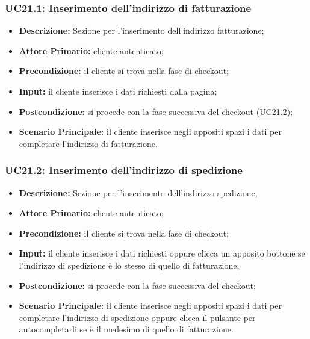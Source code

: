 \subsubsection{UC21.1: Inserimento dell'indirizzo di fatturazione}
\label{sec:UC21.1}
\begin{itemize}
    \item \textbf{Descrizione:} Sezione per l'inserimento dell'indirizzo fatturazione;
    \item \textbf{Attore Primario:} cliente autenticato;
    \item \textbf{Precondizione:} il cliente si trova nella fase di checkout;
    \item \textbf{Input:} il cliente inserisce i dati richiesti dalla pagina;
    \item \textbf{Postcondizione:} si procede con la fase successiva del checkout (\hyperref[sec:UC21.2]{\underline{UC21.2}});
    \item \textbf{Scenario Principale:} il cliente inserisce negli appositi spazi i dati per completare l'indirizzo di fatturazione.
\end{itemize}
\subsubsection{UC21.2: Inserimento dell'indirizzo di spedizione}
\label{sec:UC21.2}
\begin{itemize}
    \item \textbf{Descrizione:} Sezione per l'inserimento dell'indirizzo spedizione;
    \item \textbf{Attore Primario:} cliente autenticato;
    \item \textbf{Precondizione:} il cliente si trova nella fase di checkout;
    \item \textbf{Input:} il cliente inserisce i dati richiesti oppure clicca un apposito bottone se l'indirizzo di spedizione è lo stesso di quello di fatturazione;
    \item \textbf{Postcondizione:} si procede con la fase successiva del checkout;
    \item \textbf{Scenario Principale:} il cliente inserisce negli appositi spazi i dati per completare l'indirizzo di spedizione oppure clicca il pulsante per autocompletarli se è il medesimo di quello di fatturazione.
\end{itemize}
